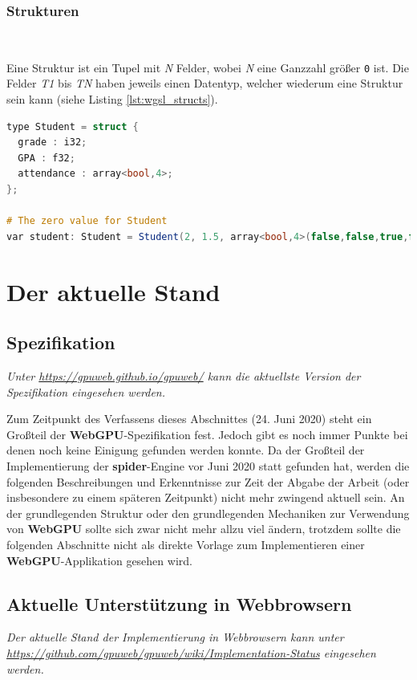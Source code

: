\documentclass[oneside]{ausarbeitung}
\begin{document}
\subsubsection{Strukturen} \

Eine Struktur ist ein Tupel mit \textit{N} Felder, wobei \textit{N} eine Ganzzahl größer \texttt{0} ist. Die Felder \textit{T1} bis \textit{TN} haben jeweils einen Datentyp, welcher wiederum eine Struktur sein kann (siehe Listing \ref{lst:wgsl_structs}).

\begin{minipage}{\textwidth}
\begin{lstlisting}[language=GLSL, label={lst:wgsl_structs}, caption={Definition und Benutzung von Strukturen in WGSL}]
type Student = struct {
  grade : i32;
  GPA : f32;
  attendance : array<bool,4>;
};

# The zero value for Student
var student: Student = Student(2, 1.5, array<bool,4>(false,false,true,false));
\end{lstlisting}
\end{minipage}

\section{Der aktuelle Stand}
\subsection{Spezifikation}
\textit{Unter \url{https://gpuweb.github.io/gpuweb/} \cite{w3:webgpu} kann die aktuellste Version der Spezifikation eingesehen werden.}

Zum Zeitpunkt des Verfassens dieses Abschnittes (24. Juni 2020) steht ein Großteil der \textbf{WebGPU}-Spezifikation fest. Jedoch gibt es noch immer Punkte bei denen noch keine Einigung gefunden werden konnte. Da der Großteil der Implementierung der \textbf{spider}-Engine vor Juni 2020 statt gefunden hat, werden die folgenden Beschreibungen und Erkenntnisse zur Zeit der Abgabe der Arbeit (oder insbesondere zu einem späteren Zeitpunkt) nicht mehr zwingend aktuell sein. An der grundlegenden Struktur oder den grundlegenden Mechaniken zur Verwendung von \textbf{WebGPU} sollte sich zwar nicht mehr allzu viel ändern, trotzdem sollte die folgenden Abschnitte nicht als direkte Vorlage zum Implementieren einer \textbf{WebGPU}-Applikation gesehen wird.



\subsection{Aktuelle Unterstützung in Webbrowsern}
\textit{Der aktuelle Stand der Implementierung in Webbrowsern kann unter \url{https://github.com/gpuweb/gpuweb/wiki/Implementation-Status} \cite{webgpu:implementation_status} eingesehen werden.}
\end{document}
